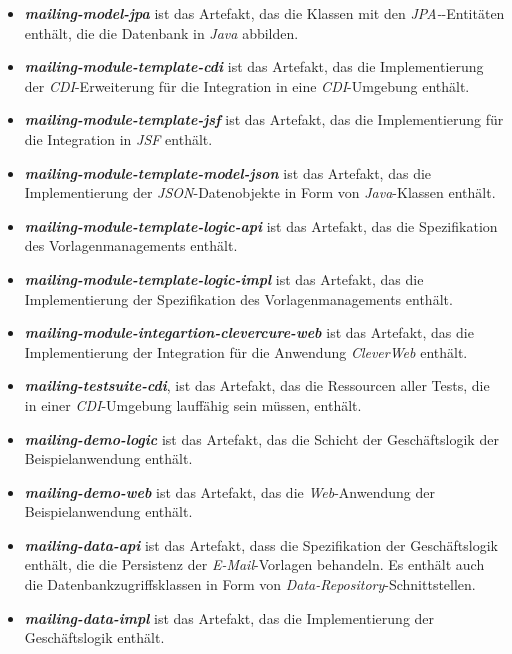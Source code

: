 \begin{itemize}
	\item\emph{\textbf{mailing-model-jpa}} 
	\newline
	ist das Artefakt, das die Klassen mit den \emph{JPA-}-Entitäten enthält, die die Datenbank in \emph{Java} abbilden.
	\item\emph{\textbf{mailing-module-template-cdi}} 
	\newline
	ist das Artefakt, das die Implementierung der \emph{CDI}-Erweiterung für die Integration in eine \emph{CDI}-Umgebung  enthält.
	\item\emph{\textbf{mailing-module-template-jsf}}
	\newline
	ist das Artefakt, das die Implementierung für die Integration in \emph{JSF} enthält.
	\item\emph{\textbf{mailing-module-template-model-json}}
	\newline
	ist das Artefakt, das die Implementierung der \emph{JSON}-Datenobjekte in Form von \emph{Java}-Klassen enthält.	
	\item\emph{\textbf{mailing-module-template-logic-api}} 
	\newline
	ist das Artefakt, das die Spezifikation des Vorlagenmanagements enthält.
	\item\emph{\textbf{mailing-module-template-logic-impl}} 
	\newline
	ist das Artefakt, das die Implementierung der Spezifikation des Vorlagenmanagements enthält.
	\item\emph{\textbf{mailing-module-integartion-clevercure-web}}
	\newline
	ist das Artefakt, das die Implementierung der Integration für die Anwendung \emph{CleverWeb} enthält.
	\item\emph{\textbf{mailing-testsuite-cdi}},
	\newline
	ist das Artefakt, das die Ressourcen aller Tests, die in einer \emph{CDI}-Umgebung lauffähig sein müssen, enthält.
	\item\emph{\textbf{mailing-demo-logic}}
	\newline
	ist das Artefakt, das die Schicht der Geschäftslogik der Beispielanwendung enthält.
	\item\emph{\textbf{mailing-demo-web}}
	\newline
	ist das Artefakt, das die \emph{Web}-Anwendung der Beispielanwendung enthält.
	\item\emph{\textbf{mailing-data-api}}
	\newline
	ist das Artefakt, dass die Spezifikation der Geschäftslogik enthält, die die Persistenz der \emph{E-Mail}-Vorlagen behandeln. Es enthält auch die Datenbankzugriffsklassen in Form von \emph{Data-Repository}-Schnittstellen.
	\item\emph{\textbf{mailing-data-impl}}
	\newline
	ist das Artefakt, das die Implementierung der Geschäftslogik enthält.
\end{itemize} 

